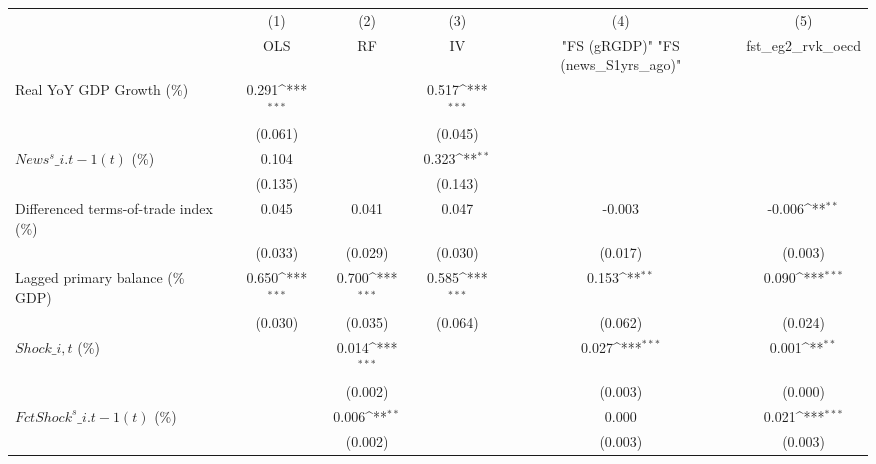 {
\def\sym#1{\ifmmode^{#1}\else\(^{#1}\)\fi}
\begin{tabular}{l*{5}{c}}
\toprule
                    &\multicolumn{1}{c}{(1)}&\multicolumn{1}{c}{(2)}&\multicolumn{1}{c}{(3)}&\multicolumn{1}{c}{(4)}&\multicolumn{1}{c}{(5)}\\
                    &\multicolumn{1}{c}{OLS}&\multicolumn{1}{c}{RF}&\multicolumn{1}{c}{IV}&\multicolumn{1}{c}{ "FS (gRGDP)"  "FS (news\_S1yrs\_ago)" }&\multicolumn{1}{c}{fst\_eg2\_rvk\_oecd}\\
\midrule
Real YoY GDP Growth (\%)&       0.291\sym{***}&                     &       0.517\sym{***}&                     &                     \\
                    &     (0.061)         &                     &     (0.045)         &                     &                     \\
\addlinespace
$ News^s\_{i.t-1}(t)$ (\%)&       0.104         &                     &       0.323\sym{**} &                     &                     \\
                    &     (0.135)         &                     &     (0.143)         &                     &                     \\
\addlinespace
Differenced terms-of-trade index (\%)&       0.045         &       0.041         &       0.047         &      -0.003         &      -0.006\sym{**} \\
                    &     (0.033)         &     (0.029)         &     (0.030)         &     (0.017)         &     (0.003)         \\
\addlinespace
Lagged primary balance (\% GDP)&       0.650\sym{***}&       0.700\sym{***}&       0.585\sym{***}&       0.153\sym{**} &       0.090\sym{***}\\
                    &     (0.030)         &     (0.035)         &     (0.064)         &     (0.062)         &     (0.024)         \\
\addlinespace
$ Shock\_{i,t}$ (\%) &                     &       0.014\sym{***}&                     &       0.027\sym{***}&       0.001\sym{**} \\
                    &                     &     (0.002)         &                     &     (0.003)         &     (0.000)         \\
\addlinespace
$ FctShock^s\_{i.t-1}(t)$ (\%)&                     &       0.006\sym{**} &                     &       0.000         &       0.021\sym{***}\\
                    &                     &     (0.002)         &                     &     (0.003)         &     (0.003)         \\

\end{tabular}}
